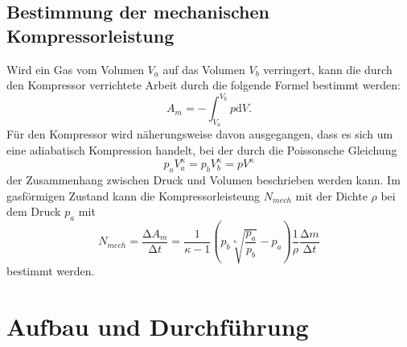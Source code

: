 \subsection{Bestimmung der mechanischen Kompressorleistung}
Wird ein Gas vom Volumen $V_a$ auf das Volumen $V_b$ verringert, kann die durch den Kompressor
verrichtete Arbeit durch die folgende Formel bestimmt werden:
\begin{equation}
\label{eq:mechanische_arbeit}
A_m=-\int_{V_a}^{V_b}p\mathup{d}V.
\end{equation}
Für den Kompressor wird näherungsweise davon ausgegangen, dass es sich um eine adiabatisch Kompression
handelt, bei der durch die Poissonsche Gleichung
\begin{equation}
  p_a V^{\kappa}_a = p_b V^{\kappa}_b = p V^{\kappa}
\end{equation}
der Zusammenhang zwischen Druck und Volumen beschrieben werden kann.
\newline
Im gasförmigen Zustand kann die Kompressorleisteung $N_{mech}$ mit der Dichte $\rho$ bei dem Druck $p_a$
mit
\begin{equation}
  \label{eqn:Nmech}
  N_{mech} = \frac{\increment A_m}{\increment t} =
  \frac{1}{\kappa - 1} \left( p_b \sqrt[\kappa]{\frac{p_a}{p_b}} - p_a \right)
  \frac{1}{\rho} \frac{\increment m}{\increment t}
\end{equation}
bestimmt werden.

\section{Aufbau und Durchführung}
